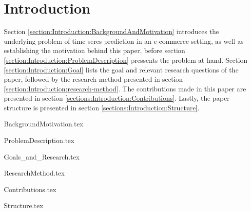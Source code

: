 \chapter{Introduction}
\label{cha:Introduction}

Section \ref{section:Introduction:BackgroundAndMotivation}
introduces the underlying problem of time seres prediction in an e-commerce setting,
as well as establishing the motivation behind this paper,
before section \ref{section:Introduction:ProblemDescription}
pressents the problem at hand.
Section \ref{section:Introduction:Goal} lists the goal and relevant research questions of the paper,
followed by the research method presented in section \ref{section:Introduction:research-method}.
The contributions made in this paper are presented in section \ref{sections:Introduction:Contributions}.
Lastly, the paper structure is presented in section \ref{sections:Introduction:Structure}.


\iffalse
All chapters should begin with an introduction before any sections begin. Further, each sections begins with an introduction before  subsections begin. Chapters with just one section or sections with just one sub-section, should be avoided. Think carefully about chapter and section titles as each title stand alone in the table of contents (without associated text) and should convey meaning for the contents of the chapter or section. 

In all chapters and sections it is important to write clearly and concisely. Avoid repetitions and if needed, refer back to the original discussion or presentation. Each new section, subsection or paragraph should provide the reader with new information and be written in your own words. Avoid direct quotes. If you use direct quotes, unless the quote itself is very significant, you are conveying to the reader that you are unable to express this discussion or fact yourself. Such direct quotes also break the flow of the language (yours to someone else's).   
\fi


{BackgroundMotivation.tex}

{ProblemDescription.tex}

{Goals_and_Research.tex}

{ResearchMethod.tex}

{Contributions.tex}

{Structure.tex}
